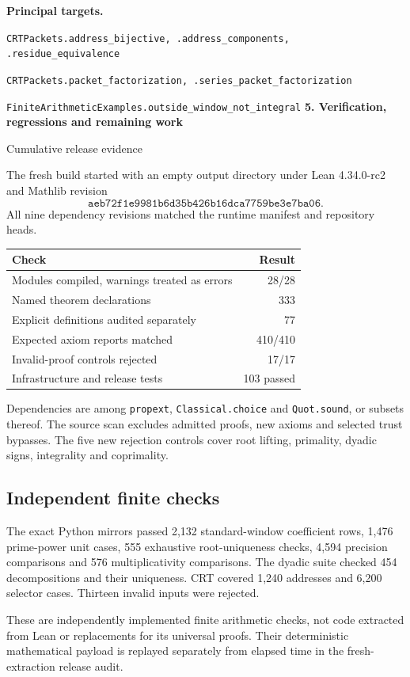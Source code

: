 \documentclass[11pt]{article}
\newcommand{\target}[1]{{\footnotesize\texttt{#1}}}
\newcommand{\pageheading}[2]{{\Large\bfseries\color{ink}#1}\par{\small #2}\par\medskip}
\begin{document}
\textbf{Principal targets.}\par
\target{CRTPackets.address\_bijective, .address\_components, .residue\_equivalence}\par
\target{CRTPackets.packet\_factorization, .series\_packet\_factorization}\par
\target{FiniteArithmeticExamples.outside\_window\_not\_integral}
\newpage
\pageheading{5. Verification, regressions and remaining work}{Cumulative release evidence}
The fresh build started with an empty output directory under Lean 4.34.0-rc2 and Mathlib revision
\[
 \texttt{aeb72f1e9981b6d35b426b16dca7759be3e7ba06}.
\]
All nine dependency revisions matched the runtime manifest and repository heads.

\begin{center}
\begin{tabular}{@{}p{}r@{}}
\toprule
Check & Result\\\midrule
Modules compiled, warnings treated as errors & 28/28\\
Named theorem declarations & 333\\
Explicit definitions audited separately & 77\\
Expected axiom reports matched & 410/410\\
Invalid-proof controls rejected & 17/17\\
Infrastructure and release tests & 103 passed\\\bottomrule
\end{tabular}
\end{center}
Dependencies are among \texttt{propext}, \texttt{Classical.choice} and \texttt{Quot.sound}, or subsets thereof. The source scan excludes admitted proofs, new axioms and selected trust bypasses. The five new rejection controls cover root lifting, primality, dyadic signs, integrality and coprimality.

\subsection*{Independent finite checks}
The exact Python mirrors passed 2,132 standard-window coefficient rows, 1,476 prime-power unit cases, 555 exhaustive root-uniqueness checks, 4,594 precision comparisons and 576 multiplicativity comparisons. The dyadic suite checked 454 decompositions and their uniqueness. CRT covered 1,240 addresses and 6,200 selector cases. Thirteen invalid inputs were rejected.

These are independently implemented finite arithmetic checks, not code extracted from Lean or replacements for its universal proofs. Their deterministic mathematical payload is replayed separately from elapsed time in the fresh-extraction release audit.
\end{document}
